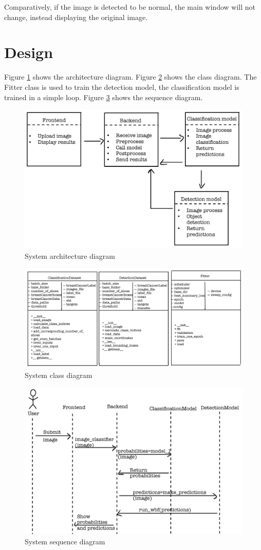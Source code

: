 Comparatively, if the image is detected to be normal, the main window will not change, instead displaying the original image.

\section{Design}

Figure \ref{fig:fig38} shows the architecture diagram. Figure \ref{fig:fig39} shows the class diagram. The Fitter class is used to train the detection model, the classification model is trained in a simple loop. Figure \ref{fig:fig40} shows the sequence diagram.

\begin{figure}[H]
    \centering
    \includegraphics[width=0.5\linewidth]{figures/Figure50.png}
    \caption{System architecture diagram}
    \label{fig:fig38}
\end{figure}

\begin{figure}[H]
    \centering
    \includegraphics[width=0.5\linewidth]{figures/Figure51.png}
    \caption{System class diagram}
    \label{fig:fig39}
\end{figure}

\begin{figure}[H]
    \centering
    \includegraphics[width=0.5\linewidth]{figures/Figure52.png}
    \caption{System sequence diagram}
    \label{fig:fig40}
\end{figure}

